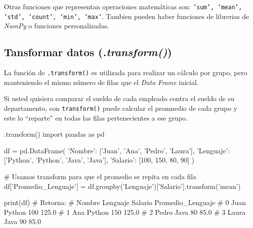 \begin{nota}
    Otras funciones que representan operaciones matemáticas son: \texttt{'sum', 'mean', 'std', 'count', 'min', 'max'}. Tambien pueden haber funciones de librerias de \textit{NumPy} o funciones personalizadas.
\end{nota}





\subsection{Tansformar datos (\textit{.transform()})}

La función de \texttt{.transform()} es utilizada para realizar un cálculo por grupo, pero manteniendo el mismo número de filas que el \textit{Data Frame} inicial.

Si usted quisiera comparar el sueldo de cada empleado contra el sueldo de su departamento, con \texttt{transform()} puede calcular el promnedio de cada grupo y este lo ``reparte'' en todas las filas pertenecientes a ese grupo.

\begin{pycode}{.transform()}
import pandas as pd

df = pd.DataFrame({
    'Nombre': ['Juan', 'Ana', 'Pedro', 'Laura'],
    'Lenguaje': ['Python', 'Python', 'Java', 'Java'],
    'Salario': [100, 150, 80, 90]
})

# Usamos transform para que el promedio se repita en cada fila
df['Promedio_Lenguaje'] = df.groupby('Lenguaje')['Salario'].transform('mean')

print(df) # Retorna:
#   Nombre Lenguaje  Salario  Promedio_Lenguaje
# 0   Juan   Python      100              125.0
# 1    Ana   Python      150              125.0
# 2  Pedro     Java       80               85.0
# 3  Laura     Java       90               85.0    
\end{pycode}


